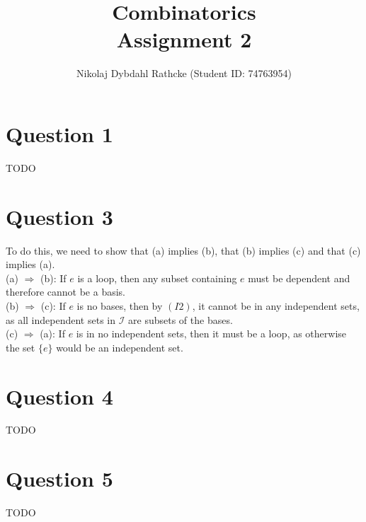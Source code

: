 \documentclass[a4paper, fleqn]{article}
\author{Nikolaj Dybdahl Rathcke (Student ID: 74763954)}
\title{Combinatorics \\ Assignment 2}
\begin{document}
\maketitle

\section*{Question 1}
TODO

\section*{Question 3}
To do this, we need to show that (a) implies (b), that (b) implies (c) and that (c) implies (a).\\
(a) $\Rightarrow$ (b): If $e$ is a loop, then any subset containing $e$ must be dependent and therefore cannot be a basis. \\
(b) $\Rightarrow$ (c): If $e$ is no bases, then by $(I2)$, it cannot be in any independent sets, as all independent sets in $\mathcal{I}$ are subsets of the bases. \\
(c) $\Rightarrow$ (a): If $e$ is in no independent sets, then it must be a loop, as otherwise the set $\{e\}$ would be an independent set.

\section*{Question 4}
TODO

\section*{Question 5}
TODO
\end{document}
